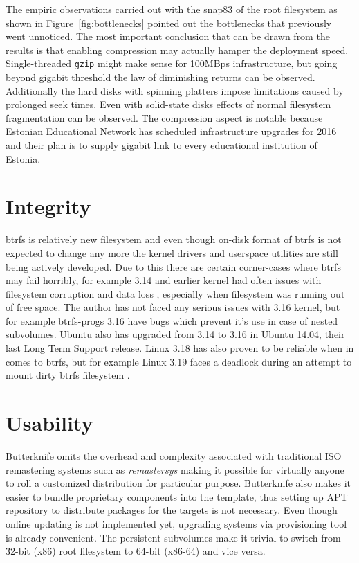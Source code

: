 \documentclass[a4paper,11pt]{kth-mag}
\begin{document}
The empiric observations carried out with
the snap83 of the root filesystem as shown in Figure~\ref{fig:bottlenecks} pointed out
the bottlenecks that previously went unnoticed.
The most important conclusion that can be drawn from the
results is that enabling compression may actually hamper the
deployment speed.
Single-threaded \lstinline!gzip! might make sense for 100MBps infrastructure,
but going beyond gigabit threshold the law of diminishing returns can be observed.
Additionally the hard disks with spinning platters
impose limitations caused by prolonged seek times.
Even with solid-state disks effects of normal filesystem fragmentation
can be observed.
The compression aspect is notable because
Estonian Educational Network has scheduled infrastructure
upgrades for 2016 and their plan is to supply
gigabit link to every educational institution of Estonia.



\section{Integrity}

\acrshort{btrfs} is relatively
new filesystem and even though on-disk format of
\acrshort{btrfs} is not expected to change any more
the kernel drivers and userspace utilities are
still being actively developed.
Due to this there are certain corner-cases where
\acrshort{btrfs} may fail horribly,
for example 3.14 and earlier kernel had often issues
with filesystem corruption and data loss
\cite{btrfs-corruption},
especially when filesystem was running out of free space.
The author has not faced any serious issues with
3.16 kernel, but for example btrfs-progs 3.16 have
bugs which prevent it's use in case of nested subvolumes.
Ubuntu also has upgraded from 3.14 to 3.16 in Ubuntu 14.04,
their last Long Term Support release.
Linux 3.18 has also proven to be reliable when in comes
to \acrshort{btrfs}, but for example Linux 3.19 faces
a deadlock during an attempt to mount
dirty \acrshort{btrfs} filesystem
\cite{btrfs-dirty-mount-deadlock}.

\section{Usability}

Butterknife omits the overhead
and complexity associated with traditional
ISO remastering systems such as \emph{remastersys}
\cite{livecd-customization}
making it possible for virtually anyone
to roll a customized distribution
for particular purpose.
Butterknife also makes it easier to
bundle proprietary components
into the template, thus setting up APT repository to distribute
packages for the targets is not necessary.
Even though online updating is not implemented yet,
upgrading systems via provisioning tool
is already convenient.
The persistent subvolumes make it trivial
to switch from 32-bit (x86) root filesystem
to 64-bit (x86-64) and vice versa.
\end{document}
